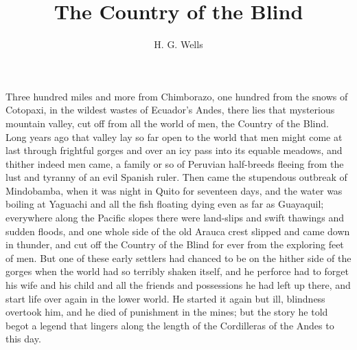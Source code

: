 \documentclass[submission]{sffms}
\author{H. G. Wells}
\title{The Country of the Blind}
\begin{document}
Three hundred miles and more from Chimborazo, one hundred from the
snows of Cotopaxi, in the wildest wastes of Ecuador's Andes, there
lies that mysterious mountain valley, cut off from all the world of
men, the Country of the Blind.  Long years ago that valley lay so far
open to the world that men might come at last through frightful gorges
and over an icy pass into its equable meadows, and thither indeed men
came, a family or so of Peruvian half-breeds fleeing from the lust and
tyranny of an evil Spanish ruler. Then came the stupendous outbreak of
Mindobamba, when it was night in Quito for seventeen days, and the
water was boiling at Yaguachi and all the fish floating dying even as
far as Guayaquil; everywhere along the Pacific slopes there were
land-slips and swift thawings and sudden floods, and one whole side of
the old Arauca crest slipped and came down in thunder, and cut off the
Country of the Blind for ever from the exploring feet of men. But one
of these early settlers had chanced to be on the hither side of the
gorges when the world had so terribly shaken itself, and he perforce
had to forget his wife and his child and all the friends and
possessions he had left up there, and start life over again in the
lower world. He started it again but ill, blindness overtook him, and
he died of punishment in the mines; but the story he told begot a
legend that lingers along the length of the Cordilleras of the Andes
to this day.
\end{document}
